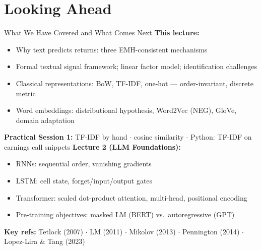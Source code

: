 \documentclass[9pt,t]{beamer}
\begin{document}
\section{Looking Ahead}

\begin{frame}{What We Have Covered and What Comes Next}
  \textbf{This lecture:}
  \begin{itemize}
    \item Why text predicts returns: three EMH-consistent mechanisms
    \item Formal textual signal framework; linear factor model; identification challenges
    \item Classical representations: BoW, TF-IDF, one-hot --- order-invariant, discrete metric
    \item Word embeddings: distributional hypothesis, Word2Vec (NEG), GloVe, domain adaptation
  \end{itemize}
  \medskip
  \textbf{Practical Session 1:} TF-IDF by hand $\cdot$ cosine similarity $\cdot$
  Python: TF-IDF on earnings call snippets
  \medskip
  \textbf{Lecture 2 (LLM Foundations):}
  \begin{itemize}
    \item RNNs: sequential order, vanishing gradients
    \item LSTM: cell state, forget/input/output gates
    \item Transformer: scaled dot-product attention, multi-head, positional encoding
    \item Pre-training objectives: masked LM (BERT) vs.\ autoregressive (GPT)
  \end{itemize}
  \medskip
  \small \textbf{Key refs:} Tetlock (2007) $\cdot$ LM (2011) $\cdot$ Mikolov (2013)
  $\cdot$ Pennington (2014) $\cdot$ Lopez-Lira \& Tang (2023)
\end{frame}

\end{document}
